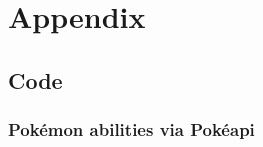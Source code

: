 \documentclass[a4paper]{article}
\newcommand{\Pokemon}{Pok\'{e}mon}
\newcommand{\Pokeapi}{Pok\'{e}api}
\begin{document}
\pagebreak{}
\section{Appendix}


\pagebreak{}

\subsection{Code}
\subsubsection{\Pokemon{} abilities via \Pokeapi{}}

\end{document}
